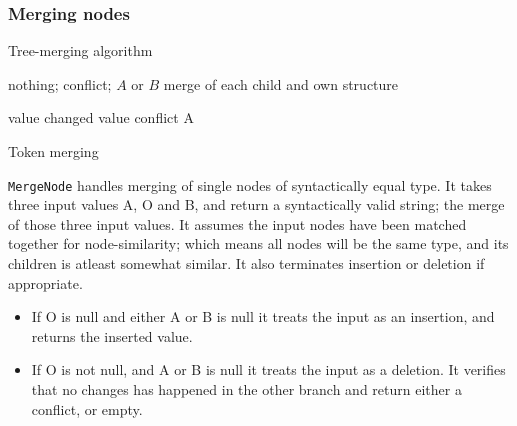 \documentclass[11pt]{article}
\begin{document}
\subsubsection{Merging nodes}
\begin{algorithm}
\caption{Tree-merging algorithm}
\label{MergeNode}
\begin{algorithmic}
            \State \Return nothing;
        \Else
            \State \Return conflict;
        \EndIf
    \EndIf
        \State \Return $A$ or $B$
    \EndIf
        \State \Return merge of each child and own structure
    \EndIf
        \State \Return {}
    \EndIf
        \State \Return {}
    \EndIf
        \State \Return {}
    \EndIf
\EndFunction
\end{algorithmic}
\end{algorithm}


\begin{algorithm}
\begin{algorithmic}
        \State \Return value
    \EndIf
        \State \Return changed value
    \EndIf
            \State \Return conflict
	    \EndIf
        \State \Return A
    \EndIf
\EndFunction
\end{algorithmic}
  \caption{Token merging}
  \label{MergeToken}
\end{algorithm}


\texttt{MergeNode} handles merging of single nodes of syntactically equal type. It takes three input values A, O and B, and return a syntactically valid string; the merge of those three input values. It assumes the input nodes have been matched together for node-similarity; which means all nodes will be the same type, and its children is atleast somewhat similar. It also terminates insertion or deletion if appropriate. 

\begin{itemize}
   \item If O is null and either A or B is null it treats the input as an insertion, and returns the inserted value.
   \item If O is not null, and A or B is null it treats the input as a deletion. It verifies that no changes has happened in the other branch and return either a conflict, or empty.
\end{itemize}
\end{document}
